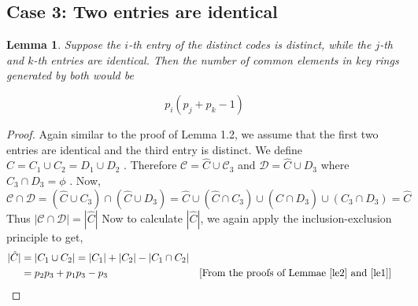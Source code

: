 \documentclass[12pt]{article}
\newtheorem{lemma}[theorem]{Lemma}
\theoremstyle{definition}
\theoremstyle{remark}
\newcommand{\C}{\mathcal{C}}
\newcommand{\D}{\mathcal{D}}
\begin{document}
\subsection{Case 3: Two entries are identical}
\begin{lemma}
    Suppose the $i$-th entry of the distinct codes is distinct, while the $j$-th and $k$-th entries are identical. Then the number of common elements in key rings generated by both would be
    
       $$p_i(p_j+p_k-1)$$
    \end{lemma}
\begin{proof}
    Again similar to the proof of Lemma 1.2, we assume that the first two entries are identical and the third entry is distinct. We define $ \hat{C} = C_1 \cup C_2 = D_1 \cup D_2$ . Therefore $\C=\hat{C} \cup \C_3 $ and $\D=\hat{C} \cup D_3$ where $C_3\cap D_3 = \phi$
    . Now,\\
        $\C \cap \D = (\hat{C} \cup C_3) \cap (\hat{C} \cup D_3)
       = \hat{C} \cup (\hat{C} \cap C_3) \cup (\hat{C} \cap D_3) \cup (C_3 \cap D_3)
       =\hat{C}$ \\
       Thus $|\C\cap\D|=|\hat{C}|$
    Now to calculate $|\hat{C}|$, we again apply the inclusion-exclusion principle to get,
    \begin{align*}
        |\hat{C}|&=|C_1\cup C_2|
                =|C_1| + |C_2| - |C_1 \cap C_2|\\
                &=p_2p_3 + p_1p_3 -p_3 &&[\text{From the proofs of Lemmae \ref{le2} and \ref{le1}} ]
    \end{align*}
\end{proof}
\end{document}

